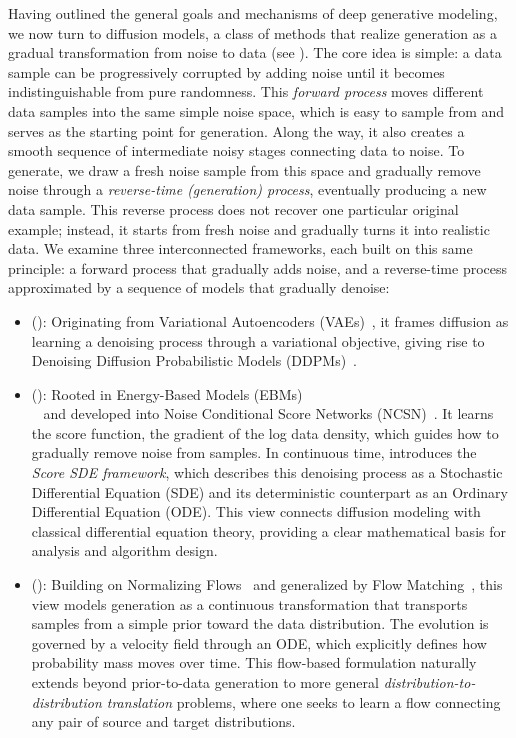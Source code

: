 Having outlined the general goals and mechanisms of deep generative modeling, we now turn to diffusion models, a class of methods that realize generation as a gradual transformation from noise to data (see ). The core idea is simple: a data sample can be progressively corrupted by adding noise until it becomes indistinguishable from pure randomness. This \emph{forward process} moves different data samples into the same simple noise space, which is easy to sample from and serves as the starting point for generation. Along the way, it also creates a smooth sequence of intermediate noisy stages connecting data to noise. To generate, we draw a fresh noise sample from this space and gradually remove noise through a \emph{reverse-time (generation) process}, eventually producing a new data sample. This reverse process does not recover one particular original example; instead, it starts from fresh noise and gradually turns it into realistic data. We examine three interconnected frameworks, each built on this same principle: a forward process that gradually adds noise, and a reverse-time process approximated by a sequence of models that gradually denoise:
\begin{itemize}
    \item {} (): Originating from Variational Autoencoders (VAEs)~\citep{kingma2013auto}, it frames diffusion as learning a denoising process through a variational objective, giving rise to Denoising Diffusion Probabilistic Models (DDPMs)~\citep{sohl2015deep,ho2020denoising}.
    \item {} (): Rooted in Energy-Based Models (EBMs)\\~\citep{ackley1985learning} and developed into Noise Conditional Score Networks (NCSN)~\citep{song2019generative}. It learns the score function, the gradient of the log data density, which guides how to gradually remove noise from samples. In continuous time,  introduces the \emph{Score SDE framework}, which describes this denoising process as a Stochastic Differential Equation (SDE) and its deterministic counterpart as an Ordinary Differential Equation (ODE). This view connects diffusion modeling with classical differential equation theory, providing a clear mathematical basis for analysis and algorithm design.
    \item {} (): Building on Normalizing Flows~\citep{rezende2015variational} and generalized by Flow Matching~\citep{lipman2022flow}, this view models generation as a continuous transformation that transports samples from a simple prior toward the data distribution. The evolution is governed by a velocity field through an ODE, which explicitly defines how probability mass moves over time. This flow-based formulation naturally extends beyond prior-to-data generation to more general \emph{distribution-to-distribution translation} problems, where one seeks to learn a flow connecting any pair of source and target distributions.
\end{itemize}


